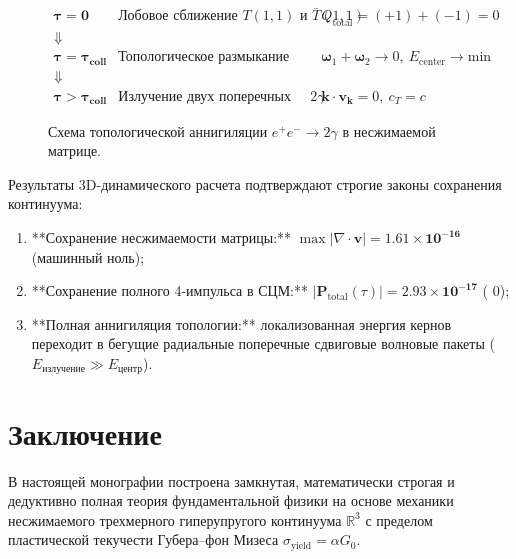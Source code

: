 \documentclass[11pt,a4paper,oneside]{article}
\theoremstyle{plain}
\theoremstyle{definition}
\theoremstyle{remark}
\numberwithin{equation}{section}
\begin{document}
\begin{figure}[h!]
\centering
\small
\begin{equation*}
	\begin{matrix}
		\mathbf{\tau = 0} & \text{Лобовое сближение } T(1,1) \text{ и } \bar{T}(1,1) & Q_{\text{total}} = (+1) + (-1) = 0 \\
		\Downarrow & & \\
		\mathbf{\tau = \tau_{\text{coll}}} & \text{Топологическое размыкание кернов} & \boldsymbol{\omega}_1 + \boldsymbol{\omega}_2 \to 0, \ E_{\text{center}} \to \text{min} \\
		\Downarrow & & \\
		\mathbf{\tau > \tau_{\text{coll}}} & \text{Излучение двух поперечных фотонов } 2\gamma & \mathbf{k} \cdot \mathbf{v}_{\mathbf{k}} = 0, \ c_T = c
	\end{matrix}
\end{equation*}
\caption{Схема топологической аннигиляции $e^+ e^- \to 2\gamma$ в несжимаемой матрице.}
\label{fig:annihilation_scheme}
\end{figure}

Результаты 3D-динамического расчета подтверждают строгие законы сохранения континуума:
\begin{enumerate}
\item **Сохранение несжимаемости матрицы:** $\max|\nabla \cdot \mathbf{v}| = \mathbf{1.61 \times 10^{-16}}$ (машинный ноль);
\item **Сохранение полного 4-импульса в СЦМ:** $|\mathbf{P}_{\text{total}}(\tau)| = \mathbf{2.93 \times 10^{-17}}$ ( $0$);
\item **Полная аннигиляция топологии:** локализованная энергия кернов переходит в бегущие радиальные поперечные сдвиговые волновые пакеты ($E_{\text{излучение}} \gg E_{\text{центр}}$).
\end{enumerate}

\section{Заключение}

В настоящей монографии построена замкнутая, математически строгая и дедуктивно полная теория фундаментальной физики на основе механики несжимаемого трехмерного гиперупругого континуума $\mathbb{R}^3$ с пределом пластической текучести Губера--фон Мизеса $\sigma_{\text{yield}} = \alpha G_0$.
\end{document}
